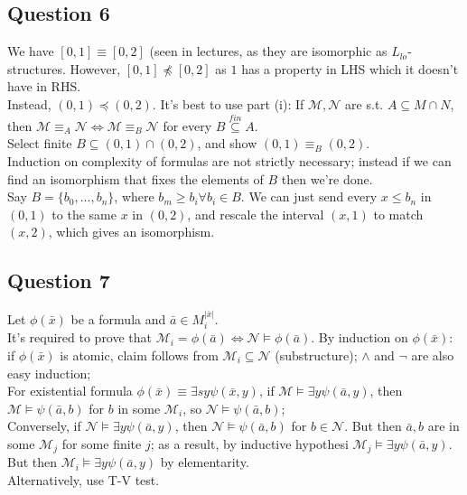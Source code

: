 \documentclass[a4paper]{article}
\begin{document}
\subsection{Question 6}
We have $[0,1] \equiv [0,2]$ (seen in lectures, as they are isomorphic as $L_{lo}$-structures. However, $[0,1] \not\preccurlyeq [0,2]$ as $1$ has a property in LHS which it doesn't have in RHS.\\
Instead, $(0,1) \preccurlyeq (0,2)$. It's best to use part (i): If $\mathcal{M},\mathcal{N}$ are s.t. $A \subseteq M \cap N$, then $\mathcal{M} \equiv_A \mathcal{N} \iff \mathcal{M} \equiv_B \mathcal{N}$ for every $B \stackrel{fin}{\subseteq} A$.\\
Select finite $B \subseteq (0,1) \cap (0,2)$, and show $(0,1) \equiv_B (0,2)$.\\
Induction on complexity of formulas are not strictly necessary; instead if we can find an isomorphism that fixes the elements of $B$ then we're done.\\
Say $B =\{b_0,...,b_n\}$, where $b_m \geq b_i \forall b_i \in B$. We can just send every $x \leq b_n$ in $(0,1)$ to the same $x$ in $(0,2)$, and rescale the interval $(x,1)$ to match $(x,2)$, which gives an isomorphism.\\

\subsection{Question 7}
Let $\phi(\bar{x})$ be a formula and $\bar{a} \in M_i^{|\bar{x}|}$.\\
It's required to prove that $\mathcal{M}_i = \phi(\bar{a}) \iff \mathcal{N} \vDash \phi(\bar{a})$. By induction on $\phi(\bar{x})$: if $\phi(\bar{x})$ is atomic, claim follows from $\mathcal{M}_i \subseteq \mathcal{N}$ (substructure); $\wedge$ and $\neg$ are also easy induction;\\
For existential formula $\phi(\bar{x}) \equiv \exists sy \psi(\bar{x},y)$, if $\mathcal{M} \vDash \exists y \psi(\bar{a},y)$, then $\mathcal{M} \vDash \psi(\bar{a},b)$ for $b$ in some $\mathcal{M}_i$, so $\mathcal{N} \vDash \psi(\bar{a},b)$;\\
Conversely, if $\mathcal{N} \vDash \exists y \psi(\bar{a},y)$, then $\mathcal{N} \vDash \psi(\bar{a},b)$ for $b \in \mathcal{N}$. But then $\bar{a},b$ are in some $\mathcal{M}_j$ for some finite $j$; as a result, by inductive hypothesi $\mathcal{M}_j \vDash \exists y \psi (\bar{a},y)$.\\
But then $\mathcal{M}_i \vDash \exists y \psi(\bar{a},y)$ by elementarity.\\
Alternatively, use T-V test.
\end{document}

